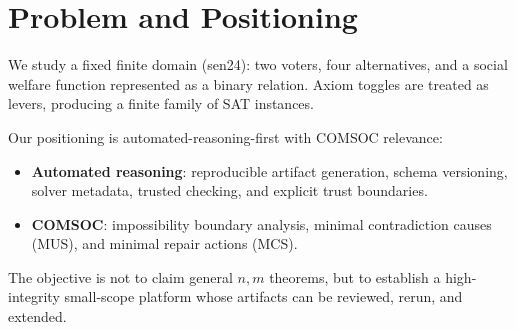 \section{Problem and Positioning}

We study a fixed finite domain (sen24): two voters, four alternatives, and a social welfare function represented as a binary relation.
Axiom toggles are treated as levers, producing a finite family of SAT instances.

Our positioning is automated-reasoning-first with COMSOC relevance:
\begin{itemize}[leftmargin=*]
  \item \textbf{Automated reasoning}: reproducible artifact generation, schema versioning, solver metadata, trusted checking, and explicit trust boundaries.
  \item \textbf{COMSOC}: impossibility boundary analysis, minimal contradiction causes (MUS), and minimal repair actions (MCS).
\end{itemize}

The objective is not to claim general $n,m$ theorems, but to establish a high-integrity small-scope platform whose artifacts can be reviewed, rerun, and extended.
